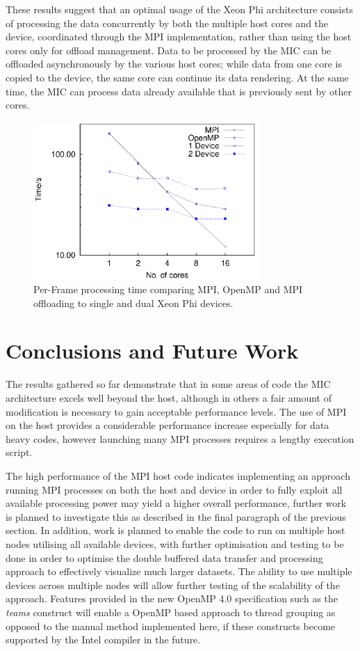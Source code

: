 \documentclass[runningheads,a4paper]{llncs}
\begin{document}
These results suggest that an optimal usage of the Xeon Phi architecture consists of processing the data concurrently by both 
the multiple host cores and the device, coordinated through the MPI implementation, rather than using the host cores only for offload 
management.
Data to be processed by the MIC can be offloaded asynchronously by the various host cores; while data from one core is copied to 
the device, the same core can continue its data rendering. At the same time, the MIC can process data already available that is 
previously sent by other cores.

\begin{figure}
\centering
\includegraphics[height=6.0cm]{mpi_omp_mic}
\caption{Per-Frame processing time comparing MPI, OpenMP and MPI offloading to single and dual Xeon Phi devices.}
\label{fig:mpitimes}
\end{figure}



\section{Conclusions and Future Work}
\label{sect:conclusions}

The results gathered so far demonstrate that in some areas of code the MIC architecture excels well beyond the host, 
although in others a fair amount of modification is necessary to gain acceptable performance levels. The use of MPI on the host
provides a considerable performance increase especially for data heavy codes, however launching many MPI processes requires a lengthy 
execution script.

The high performance of the MPI host code indicates implementing an approach running MPI processes on both the host and device 
in order to fully exploit all available processing power may yield a higher overall performance, further work is planned to investigate this 
as described in the final paragraph of the previous section.
In addition, work is planned to enable the code to run on multiple host nodes utilising all available devices, with further optimisation and 
testing to be done in order to optimise the double buffered data transfer and processing approach to effectively visualize much larger 
datasets. The ability to use multiple devices across multiple nodes will allow further testing of the scalability of the approach. 
Features provided in the new OpenMP 4.0 specification such as the \textit{teams} construct will enable a OpenMP based approach to 
thread grouping as opposed to the manual method implemented here, if these constructs become supported by the Intel compiler in the future. 
\end{document}
